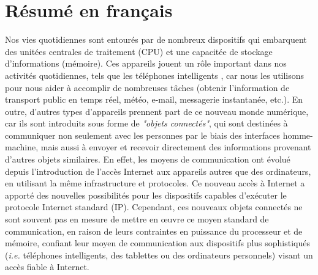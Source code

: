 \chapter*{R\'esum\'e en fran\c{c}ais}
Nos vies quotidiennes sont entour\'es par de nombreux dispositifs qui embarquent des unit\'ees centrales de traitement (CPU) et une capacit\'ee de stockage d'informations (m\'emoire).
Ces appareils jouent un r\^ole important dans nos activit\'es quotidiennes, tels que les t\'el\'ephones intelligents \cite{sarwar2013impact}, car nous les utilisons pour nous aider \`a accomplir de nombreuses t\^aches (obtenir l'information de transport public en temps r\'eel, m\'et\'eo, e-mail, messagerie instantan\'ee, etc.).
En outre, d'autres types d'appareils prennent part de ce nouveau monde num\'erique, car ils sont introduits sous forme de \textit{"objets connect\'es"}, qui sont destinées \`a communiquer non seulement avec les personnes par le biais des interfaces homme-machine, mais aussi \`a envoyer et recevoir directement des informations provenant d'autres objets similaires.
En effet, les moyens de communication ont \'evolu\'e depuis l'introduction de l'acc\`es Internet aux appareils autres que des ordinateurs, en utilisant la m\^eme infrastructure et protocoles.
Ce nouveau acc\`es \`a Internet a apport\'e des nouvelles possibilit\'es pour les dispositifs capables d'ex\'ecuter le protocole Internet standard (IP).
Cependant, ces nouveaux objets connect\'es ne sont souvent pas en mesure de mettre en œuvre ce moyen standard de communication, en raison de leurs contraintes en puissance du processeur et de m\'emoire, confiant leur moyen de communication aux dispositifs plus sophistiqu\'es (\textit{i.e.} t\'el\'ephones intelligents, des tablettes ou des ordinateurs personnels) visant un acc\`es fiable \`a Internet.

